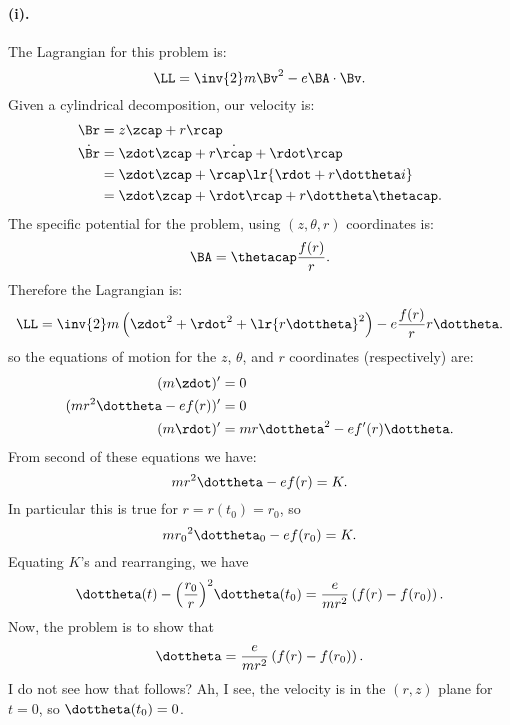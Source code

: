 {\paragraph{(i).}
%
The Lagrangian for this problem is:
%
\begin{equation}\label{eqn:tongMf1:1860}
\LL = \inv{2} m \Bv^2 - e \BA \cdot \Bv.
\end{equation}
%
Given a cylindrical decomposition, our velocity is:
%
\begin{equation}\label{eqn:tongMf1:780}
\begin{aligned}
\Br &= z \zcap + r \rcap \\
\dot{\Br}
&= \zdot \zcap + r\dot{\rcap} + \rdot \rcap \\
&= \zdot \zcap + \rcap
\lr{ \rdot + r\dottheta i } \\
&= \zdot \zcap + \rdot \rcap + r\dottheta \thetacap.
\end{aligned}
\end{equation}
%
The specific potential for the problem, using \((z,\theta,r)\) coordinates is:
%
\begin{equation}\label{eqn:tongMf1:1880}
\BA = \thetacap \frac{f(r)}{r}.
\end{equation}
%
Therefore the Lagrangian is:
\begin{equation}\label{eqn:tongMf1:1900}
\LL = \inv{2} m \left(\zdot^2 + \rdot^2 +
\lr{ r\dottheta }^2
\right) - e \frac{f(r)}{r} r \dottheta.
\end{equation}
%
so the equations of motion for the \(z\), \(\theta\), and \(r\) coordinates (respectively) are:
%
\begin{equation}\label{eqn:tongMf1:800}
\begin{aligned}
(m\zdot)' &= 0 \\
(m r^2 \dottheta -e f(r))' &= 0 \\
(m \rdot)' &= m r \dottheta^2 - e f'(r) \dottheta .
\end{aligned}
\end{equation}
%
From second of these equations we have:
%
\begin{equation}\label{eqn:tongMf1:1920}
m r^2 \dottheta - e f(r) = K.
\end{equation}
%
In particular this is true for \(r = r(t_0) = r_0\), so
%
\begin{equation}\label{eqn:tongMf1:1940}
m {r_0}^2 \dottheta_0 - e f(r_0) = K.
\end{equation}
%
Equating \( K \)'s and rearranging, we have
\begin{equation}\label{eqn:tongMf1:1960}
\dottheta(t) - {\left(\frac{r_0}{r}\right)}^2 \dottheta(t_0) = \frac{e}{m r^2} \left( f(r) - f(r_0) \right).
\end{equation}
%
Now, the problem is to show that
\begin{equation}\label{eqn:tongMf1:1980}
\dottheta = \frac{e}{mr^2} \left(f(r) - f(r_0)\right).
\end{equation}
%
I do not see how that follows?  Ah, I see, the velocity is in the \((r,z)\) plane for \(t=0\), so \(\dottheta(t_0) = 0\).
%
}
